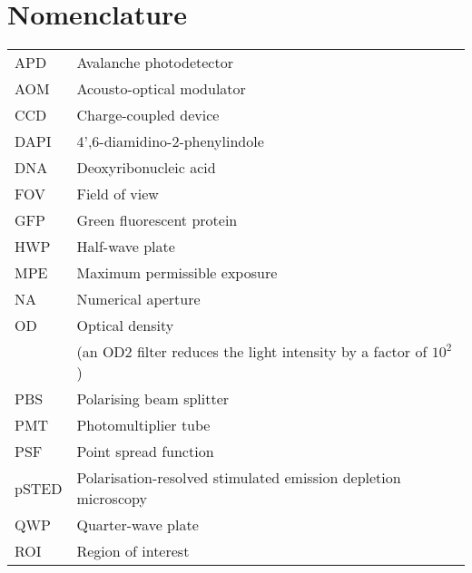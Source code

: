 \chapter{Nomenclature}

\begin{tabular}{ll}
	APD       & Avalanche photodetector                                             \\
	AOM       & Acousto-optical modulator                                           \\
	CCD       & Charge-coupled device                                               \\
	DAPI      & 4',6-diamidino-2-phenylindole                                     \\
	DNA       & Deoxyribonucleic acid                                               \\ %
	FOV       & Field of view                                                       \\
	GFP       & Green fluorescent protein                                           \\
	HWP       & Half-wave plate                                                     \\
	MPE       & Maximum permissible exposure                                        \\
	NA        & Numerical aperture                                                  \\
	OD        & Optical density                                                     \\
	          & (an OD2 filter reduces the light intensity by a factor of $ 10^2 $) \\
	PBS       & Polarising beam splitter                                            \\
	PMT       & Photomultiplier tube                                                \\
	PSF       & Point spread function                                               \\
	pSTED     & Polarisation-resolved stimulated emission depletion microscopy      \\
	QWP       & Quarter-wave plate                                                  \\
	ROI       & Region of interest                                                  \\

\end{tabular}
